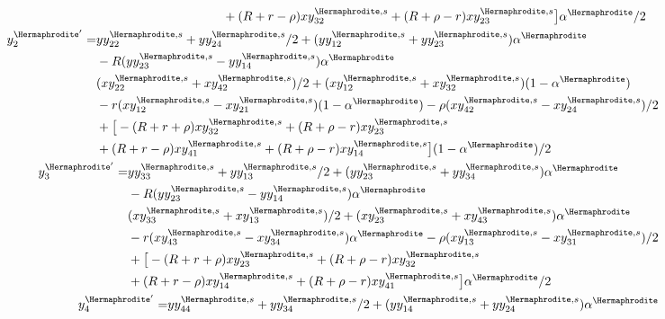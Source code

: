\documentclass[12pt]{article}
\begin{document}
\begin{subequations}
\begin{align}
\begin{split}
& + (R+r-\rho)xy_{32}^{\Hermaphrodite,s} + (R+\rho-r) xy_{23}^{\Hermaphrodite,s}\big{]}\alpha^\Hermaphrodite/2
\end{split}
\\
%
\begin{split}
y_{2}^{{\Hermaphrodite}'}=&yy_{22}^{\Hermaphrodite,s}+yy_{24}^{\Hermaphrodite,s}/2+(yy_{12}^{\Hermaphrodite,s}+yy_{23}^{\Hermaphrodite,s})\alpha^\Hermaphrodite\\
&-R(yy_{23}^{\Hermaphrodite,s}-yy_{14}^{\Hermaphrodite,s}) \alpha^\Hermaphrodite\\
&(xy_{22}^{\Hermaphrodite,s}+xy_{42}^{\Hermaphrodite,s})/2+(xy_{12}^{\Hermaphrodite,s}+xy_{32}^{\Hermaphrodite,s})(1-\alpha^\Hermaphrodite)\\
&- r(xy_{12}^{\Hermaphrodite,s}-xy_{21}^{\Hermaphrodite,s})(1-\alpha^\Hermaphrodite) - \rho(xy_{42}^{\Hermaphrodite,s}-xy_{24}^{\Hermaphrodite,s})/2\\
&+\big{[}-(R+r+\rho)xy_{32}^{\Hermaphrodite,s} +(R+\rho-r) xy_{23}^{\Hermaphrodite,s}\\
&+(R+r-\rho)xy_{41}^{\Hermaphrodite,s}+(R+\rho-r)xy_{14}^{\Hermaphrodite,s}\big{]}(1-\alpha^\Hermaphrodite)/2
\end{split}
\\
%
\begin{split}
y_{3}^{{\Hermaphrodite}'}=&yy_{33}^{\Hermaphrodite,s}+yy_{13}^{\Hermaphrodite,s}/2+(yy_{23}^{\Hermaphrodite,s}+yy_{34}^{\Hermaphrodite,s})\alpha^\Hermaphrodite\\
&-R(yy_{23}^{\Hermaphrodite,s}-yy_{14}^{\Hermaphrodite,s}) \alpha^\Hermaphrodite\\
&(xy_{33}^{\Hermaphrodite,s}+xy_{13}^{\Hermaphrodite,s})/2+(xy_{23}^{\Hermaphrodite,s}+xy_{43}^{\Hermaphrodite,s})\alpha^\Hermaphrodite\\
&- r(xy_{43}^{\Hermaphrodite,s}-xy_{34}^{\Hermaphrodite,s})\alpha^\Hermaphrodite - \rho(xy_{13}^{\Hermaphrodite,s}-xy_{31}^{\Hermaphrodite,s})/2\\
&+\big{[}-(R+r+\rho)xy_{23}^{\Hermaphrodite,s} +(R+\rho-r)xy_{32}^{\Hermaphrodite,s}\\
&+(R+r-\rho) xy_{14}^{\Hermaphrodite,s} + (R+\rho-r) xy_{41}^{\Hermaphrodite,s}\big{]}\alpha^\Hermaphrodite/2
\end{split}
\\
%
\begin{split}
y_{4}^{{\Hermaphrodite}'}=&yy_{44}^{\Hermaphrodite,s}+yy_{34}^{\Hermaphrodite,s}/2+(yy_{14}^{\Hermaphrodite,s}+yy_{24}^{\Hermaphrodite,s})\alpha^\Hermaphrodite\\

\end{split}
\end{align}
\end{subequations}
\end{document}
